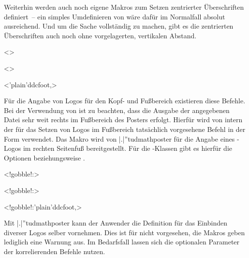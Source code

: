 \begin{DeclareEntity}{}
\begin{NoIndexDefault}
\begin{Declaration}
\begin{Declaration}
\begin{Declaration}
\begin{Declaration}
Weiterhin werden auch noch eigene Makros zum Setzen zentrierter Überschriften 
definiert~-- ein simples Umdefinieren von  wäre dafür im 
Normalfall absolut ausreichend. Und um die Sache vollständig zu machen, gibt es 
die zentrierten Überschriften auch noch ohne vorgelagerten, vertikalen Abstand.
\end{Declaration}
\end{Declaration}
\end{Declaration}
\end{Declaration}

\begin{Declaration}
  {}
  <>
\begin{Declaration}
  {}
  <>
\begin{Declaration}
  {}
  <\Option'plain'{ddcfoot},>
\printdeclarationlist

Für die Angabe von Logos für den Kopf- und Fußbereich existieren diese Befehle. 
Bei der Verwendung von  ist zu 
beachten, dass die Ausgabe der angegebenen Datei sehr weit rechts im Fußbereich 
des Posters erfolgt. Hierfür wird von \TUDScript intern der für das Setzen von 
Logos im Fußbereich tatsächlich vorgesehene Befehl in der Form 
verwendet. Das Makro  wird von \Class|.|''{tudmathposter} 
für die Angabe eines \DDC-Logos im rechten Seitenfuß bereitgestellt. Für die 
\TUDScript-Klassen gibt es hierfür die Optionen  beziehungsweise 
.
\end{Declaration}
\end{Declaration}
\end{Declaration}

\begin{Declaration}
  {}
  <!gobble!:>
\begin{Declaration}
  {}
  <!gobble!:>
\begin{Declaration}
  {}
  <!gobble!:\Option'plain'{ddcfoot},>
\printdeclarationlist

Mit \Class|.|''{tudmathposter} kann der Anwender die Definition für das 
Einbinden diverser Logos selber vornehmen. Dies ist für \TUDScript nicht 
vorgesehen, die Makros geben lediglich eine Warnung aus. Im Bedarfsfall lassen 
sich die optionalen Parameter der korrelierenden Befehle nutzen. 
\end{Declaration}
\end{Declaration}
\end{Declaration}


\end{NoIndexDefault}
\end{DeclareEntity}
